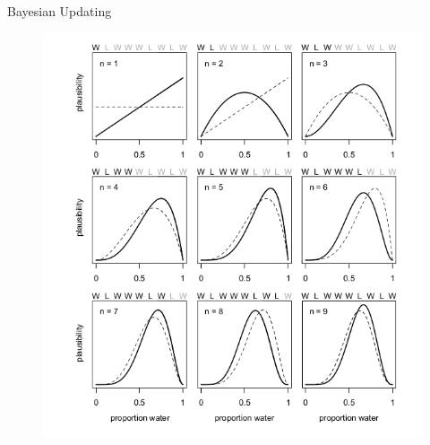 \documentclass[handout]{beamer}
\begin{document}
\begin{frame}{Bayesian Updating}
\scriptsize{

\begin{figure}[h!]
	\centering
	\includegraphics[scale=0.35]{pics/bayesUpdate.png}
\end{figure}

} 

\end{frame}
\end{document}
